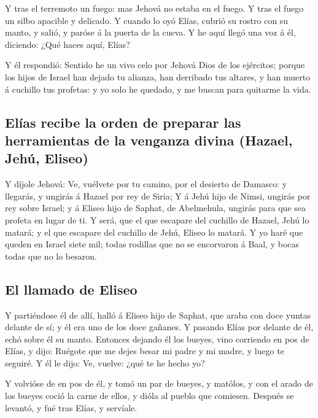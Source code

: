  Y tras el terremoto un fuego: mas Jehová no estaba en el
fuego. Y tras el fuego un silbo apacible y delicado.  Y
cuando lo oyó Elías, cubrió su rostro con su manto, y salió, y paróse á
la puerta de la cueva. Y he aquí llegó una voz á él, diciendo: ¿Qué
haces aquí, Elías?

 Y él respondió: Sentido he un vivo celo por Jehová Dios
de los ejércitos; porque los hijos de Israel han dejado tu alianza, han
derribado tus altares, y han muerto á cuchillo tus profetas: y yo solo
he quedado, y me buscan para quitarme la vida.

\hypertarget{eluxedas-recibe-la-orden-de-preparar-las-herramientas-de-la-venganza-divina-hazael-jehuxfa-eliseo}{%
\subsection{Elías recibe la orden de preparar las herramientas de la
venganza divina (Hazael, Jehú,
Eliseo)}\label{eluxedas-recibe-la-orden-de-preparar-las-herramientas-de-la-venganza-divina-hazael-jehuxfa-eliseo}}

 Y díjole Jehová: Ve, vuélvete por tu camino, por el
desierto de Damasco: y llegarás, y ungirás á Hazael por rey de Siria;
 Y á Jehú hijo de Nimsi, ungirás por rey sobre Israel; y
á Eliseo hijo de Saphat, de Abelmehula, ungirás para que sea profeta en
lugar de ti.  Y será, que el que escapare del cuchillo de
Hazael, Jehú lo matará; y el que escapare del cuchillo de Jehú, Eliseo
lo matará.  Y yo haré que queden en Israel siete mil;
todas rodillas que no se encorvaron á Baal, y bocas todas que no lo
besaron.

\hypertarget{el-llamado-de-eliseo}{%
\subsection{El llamado de Eliseo}\label{el-llamado-de-eliseo}}

 Y partiéndose él de allí, halló á Eliseo hijo de Saphat,
que araba con doce yuntas delante de sí; y él era uno de los doce
gañanes. Y pasando Elías por delante de él, echó sobre él su manto.
 Entonces dejando él los bueyes, vino corriendo en pos de
Elías, y dijo: Ruégote que me dejes besar mi padre y mi madre, y luego
te seguiré. Y él le dijo: Ve, vuelve: ¿qué te he hecho yo?

 Y volvióse de en pos de él, y tomó un par de bueyes, y
matólos, y con el arado de los bueyes coció la carne de ellos, y dióla
al pueblo que comiesen. Después se levantó, y fué tras Elías, y
servíale.

